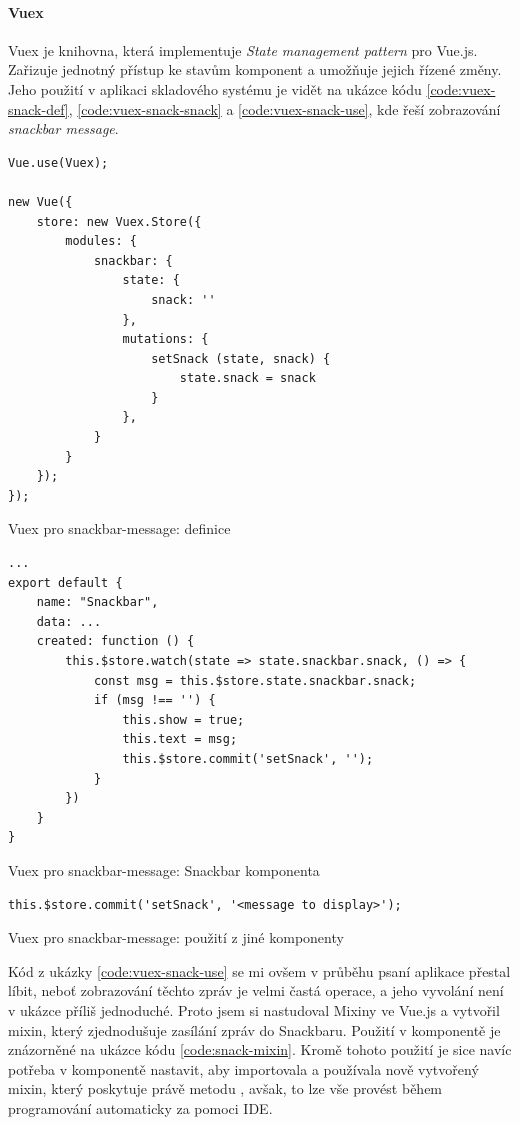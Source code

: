 \paragraph{Vuex} Vuex \cite{vuex} je knihovna, která implementuje \emph{State management pattern} pro Vue.js. Zařizuje jednotný přístup ke stavům komponent a umožňuje jejich řízené změny. Jeho použití v aplikaci skladového systému je vidět na ukázce kódu \ref{code:vuex-snack-def}, \ref{code:vuex-snack-snack} a \ref{code:vuex-snack-use}, kde řeší zobrazování \emph{snackbar message}.

\begin{listing}[h]
\begin{verbatim}
Vue.use(Vuex);

new Vue({
    store: new Vuex.Store({
        modules: {
            snackbar: {
                state: {
                    snack: ''
                },
                mutations: {
                    setSnack (state, snack) {
                        state.snack = snack
                    }
                },
            }
        }
    });
});
\end{verbatim}
\caption{Vuex pro snackbar-message: definice} \label{code:vuex-snack-def}
\end{listing}

\begin{listing}[h]
\begin{verbatim}
...
export default {
    name: "Snackbar",
    data: ...
    created: function () {
        this.$store.watch(state => state.snackbar.snack, () => {
            const msg = this.$store.state.snackbar.snack;
            if (msg !== '') {
                this.show = true;
                this.text = msg;
                this.$store.commit('setSnack', '');
            }
        })
    }
}
\end{verbatim}
\caption{Vuex pro snackbar-message: Snackbar komponenta} \label{code:vuex-snack-snack}
\end{listing}

\begin{listing}[h]
\begin{verbatim}
this.$store.commit('setSnack', '<message to display>');
\end{verbatim}
\caption{Vuex pro snackbar-message: použití z jiné komponenty} \label{code:vuex-snack-use}
\end{listing}

Kód z ukázky \ref{code:vuex-snack-use} se mi ovšem v průběhu psaní aplikace přestal líbit, neboť zobrazování těchto zpráv je velmi častá operace, a jeho vyvolání není v ukázce příliš jednoduché. Proto jsem si nastudoval Mixiny ve Vue.js \cite{vue-mixins} a vytvořil mixin, který zjednodušuje zasílání zpráv do Snackbaru. Použití v komponentě je znázorněné na ukázce kódu \ref{code:snack-mixin}. Kromě tohoto použití je sice navíc potřeba v komponentě nastavit, aby importovala a používala nově vytvořený mixin, který poskytuje právě metodu , avšak, to lze vše provést během programování automaticky za pomoci IDE.

